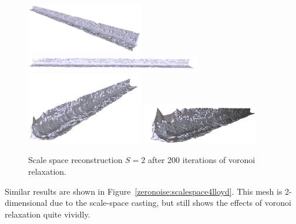 \documentclass[12pt]{drexelthesis}
\begin{document}
\begin{figure}[!ht]
	
	\centering
		\includegraphics[width=2in]{simulated-lab-scan/0noise/optimized/scalespace2Lloyd30s200it00.png}
		\includegraphics[width=3in]{simulated-lab-scan/0noise/optimized/scalespace2Lloyd30s200it01.png}
		\includegraphics[width=2in]{simulated-lab-scan/0noise/optimized/scalespace2Lloyd30s200it02.png}
		\includegraphics[width=2in]{simulated-lab-scan/0noise/optimized/scalespace2Lloyd30s200it03.png}
		\caption[Scale space reconstruction $S = 2$ after 200 iterations of voronoi relaxation]{\centering Scale space reconstruction $S = 2$ after 200 iterations of voronoi relaxation.}
	\label{zeronoise:scalespace2lloyd}
\end{figure}

Similar results are shown in Figure~\ref{zeronoise:scalespace4lloyd}. This mesh is 2-dimensional due to the scale-space casting, but still shows the effects of voronoi relaxation quite vividly.
\end{document}
